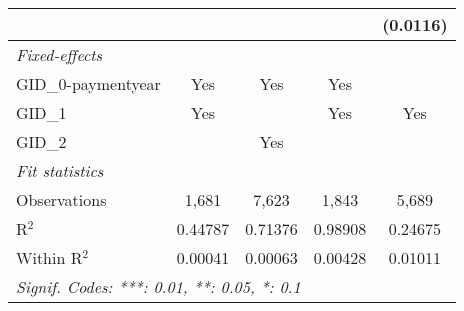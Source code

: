 \begin{tabular}{lcccc}
                                                       &          &               &          & (0.0116)\\   
   \midrule
   \emph{Fixed-effects}\\
   GID\_0-paymentyear                                  & Yes      & Yes           & Yes      & \\  
   GID\_1                                              & Yes      &               & Yes      & Yes\\  
   GID\_2                                              &          & Yes           &          & \\  
   \midrule
   \emph{Fit statistics}\\
   Observations                                        & 1,681    & 7,623         & 1,843    & 5,689\\  
   R$^2$                                               & 0.44787  & 0.71376       & 0.98908  & 0.24675\\  
   Within R$^2$                                        & 0.00041  & 0.00063       & 0.00428  & 0.01011\\  
   \midrule \midrule
   \multicolumn{5}{l}{\emph{Signif. Codes: ***: 0.01, **: 0.05, *: 0.1}}\\
\end{tabular}
\par\endgroup



